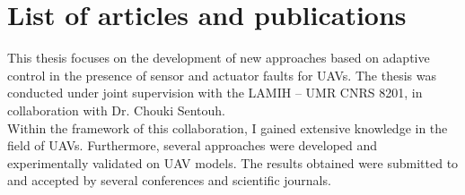 \chapter*{List of articles and publications}

This thesis focuses on the development of new approaches based on adaptive control in the presence of sensor and actuator faults for UAVs. The thesis was conducted under joint supervision with the LAMIH – UMR CNRS 8201, in collaboration with Dr. Chouki Sentouh.\\
Within the framework of this collaboration, I gained extensive knowledge in the field of UAVs. Furthermore, several approaches were developed and experimentally validated on UAV models. The results obtained were submitted to and accepted by several conferences and scientific journals.

